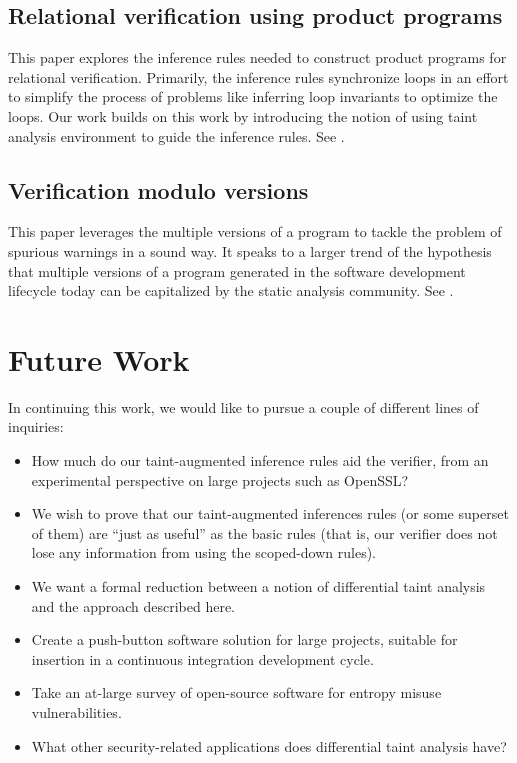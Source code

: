 \documentclass[letterpaper,twocolumn,10pt]{article}
\begin{document}
\subsection{Relational verification using product programs}

This paper explores the inference rules needed to construct product programs for relational verification. Primarily, the inference rules synchronize loops in an effort to simplify the process of problems like inferring loop invariants to optimize the loops. Our work builds on this work by introducing the notion of using taint analysis environment to guide the inference rules. See \cite{barthe2011relational}.

\subsection{Verification modulo versions}

This paper leverages the multiple versions of a program to tackle the problem of spurious warnings in a sound way. It speaks to a larger trend of the hypothesis that multiple versions of a program generated in the software development lifecycle today can be capitalized by the static analysis community. See \cite{logozzo2014verification}.


\section{Future Work}

In continuing this work, we would like to pursue a couple of different lines of inquiries:

\begin{itemize}
    \item How much do our taint-augmented inference rules aid the verifier, from an experimental perspective on large projects such as OpenSSL?
    \item We wish to prove that our taint-augmented inferences rules (or some superset of them) are ``just as useful'' as the basic rules (that is,
    our verifier does not lose any information from using the scoped-down rules).
    \item We want a formal reduction between a notion of differential taint analysis and the approach described here.
    \item Create a push-button software solution for large projects, suitable for insertion in a continuous integration development cycle.
    \item Take an at-large survey of open-source software for entropy misuse vulnerabilities.
    \item What other security-related applications does differential taint analysis have?
\end{itemize}
\end{document}
